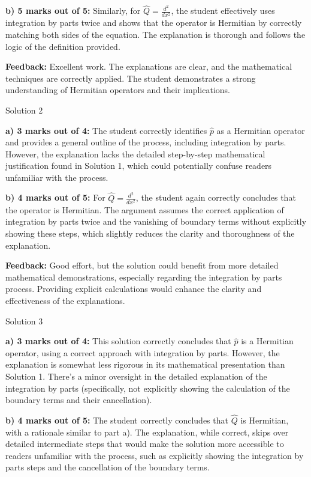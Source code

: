 \documentclass[a4paper,11pt]{article}
\begin{document}
\textbf{b) 5 marks out of 5:} Similarly, for \( \hat{Q} = \frac{d^{2}}{dx^{2}} \), the student effectively uses integration by parts twice and shows that the operator is Hermitian by correctly matching both sides of the equation. The explanation is thorough and follows the logic of the definition provided.

\textbf{Feedback:} Excellent work. The explanations are clear, and the mathematical techniques are correctly applied. The student demonstrates a strong understanding of Hermitian operators and their implications.

Solution 2

\textbf{a) 3 marks out of 4:} The student correctly identifies \( \hat{p} \) as a Hermitian operator and provides a general outline of the process, including integration by parts. However, the explanation lacks the detailed step-by-step mathematical justification found in Solution 1, which could potentially confuse readers unfamiliar with the process.

\textbf{b) 4 marks out of 5:} For \( \hat{Q} = \frac{d^{2}}{dx^{2}} \), the student again correctly concludes that the operator is Hermitian. The argument assumes the correct application of integration by parts twice and the vanishing of boundary terms without explicitly showing these steps, which slightly reduces the clarity and thoroughness of the explanation.

\textbf{Feedback:} Good effort, but the solution could benefit from more detailed mathematical demonstrations, especially regarding the integration by parts process. Providing explicit calculations would enhance the clarity and effectiveness of the explanations.

Solution 3

\textbf{a) 3 marks out of 4:} This solution correctly concludes that \( \hat{p} \) is a Hermitian operator, using a correct approach with integration by parts. However, the explanation is somewhat less rigorous in its mathematical presentation than Solution 1. There's a minor oversight in the detailed explanation of the integration by parts (specifically, not explicitly showing the calculation of the boundary terms and their cancellation).

\textbf{b) 4 marks out of 5:} The student correctly concludes that \( \hat{Q} \) is Hermitian, with a rationale similar to part a). The explanation, while correct, skips over detailed intermediate steps that would make the solution more accessible to readers unfamiliar with the process, such as explicitly showing the integration by parts steps and the cancellation of the boundary terms.
\end{document}
